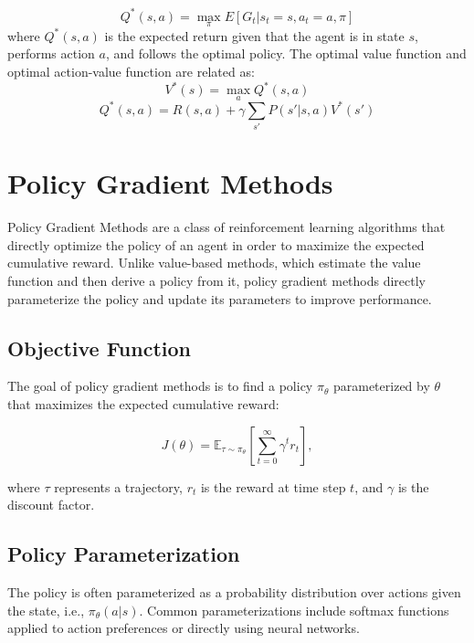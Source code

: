 \documentclass[conference]{IEEEtran}
\begin{document}
\begin{equation}
    Q^*(s, a) = \max_{\pi}E[G_t|s_t = s, a_t = a, \pi]
\end{equation}
where \(Q^*(s, a)\) is the expected return given that the agent is in state \(s\), performs action \(a\), and follows the optimal policy. The optimal value function and optimal action-value function are related as:
\begin{equation}
    V^*(s) = \max_{a}Q^*(s, a)
\end{equation}
\begin{equation}
    Q^*(s, a) = R(s, a) + \gamma\sum_{s'}P(s'|s, a)V^*(s')
\end{equation}

\section{Policy Gradient Methods}

Policy Gradient Methods are a class of reinforcement learning algorithms that directly optimize the policy of an agent in order to maximize the expected cumulative reward. Unlike value-based methods, which estimate the value function and then derive a policy from it, policy gradient methods directly parameterize the policy and update its parameters to improve performance.

\subsection{Objective Function}

The goal of policy gradient methods is to find a policy $\pi_{\theta}$ parameterized by $\theta$ that maximizes the expected cumulative reward:

\begin{equation}
J(\theta) = \mathbb{E}_{\tau \sim \pi_{\theta}} \left[ \sum_{t=0}^{\infty} \gamma^t r_t \right],
\end{equation}

where $\tau$ represents a trajectory, $r_t$ is the reward at time step $t$, and $\gamma$ is the discount factor.

\subsection{Policy Parameterization}

The policy is often parameterized as a probability distribution over actions given the state, i.e., $\pi_{\theta}(a|s)$. Common parameterizations include softmax functions applied to action preferences or directly using neural networks.
\end{document}
